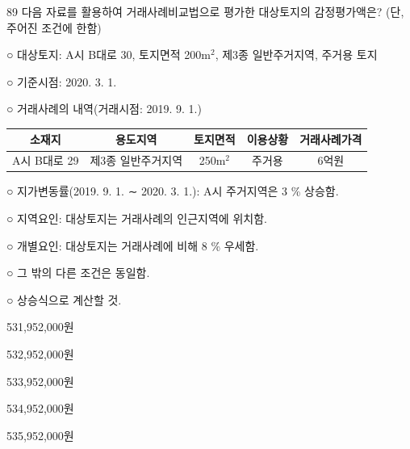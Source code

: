 \begin{question}{89}
다음 자료를 활용하여 거래사례비교법으로 평가한 대상토지의 감정평가액은? (단, 주어진 조건에 한함)
\begin{framedtext}
○ 대상토지: A시 B대로 30, 토지면적 200m$^2$, 제3종 일반주거지역, 주거용 토지 \par
○ 기준시점: 2020. 3. 1. \par
○ 거래사례의 내역(거래시점: 2019. 9. 1.) \par
{\small\centering
\begin{tabular}{|c|c|c|c|c|}\hline
소재지 & 용도지역 & 토지면적 & 이용상황 & 거래사례가격 \\ \hline
A시 B대로 29 & 제3종 일반주거지역 & 250m$^2$ & 주거용 & 6억원 \\ \hline
\end{tabular}\par}
○ 지가변동률(2019. 9. 1. ∼ 2020. 3. 1.): A시 주거지역은 3 \% 상승함. \par
○ 지역요인: 대상토지는 거래사례의 인근지역에 위치함. \par
○ 개별요인: 대상토지는 거래사례에 비해 8 \% 우세함. \par
○ 그 밖의 다른 조건은 동일함. \par
○ 상승식으로 계산할 것.
\end{framedtext}
\begin{choices}
  \item 531,952,000원
  \item 532,952,000원
  \item 533,952,000원
  \item 534,952,000원
  \item 535,952,000원
\end{choices}
\end{question}
